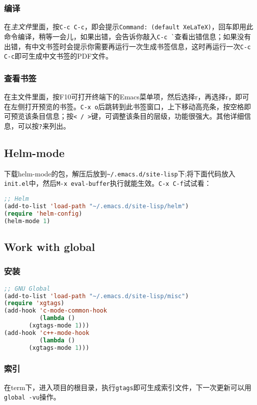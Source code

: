 \subsubsection{编译}
\label{sec:auctex-compile}
在\emph{主文件}里面，按\verb|C-c C-c|，即会提示\verb|Command: (default XeLaTeX)|，回车即用此命令编译，稍等一会儿，如果出错，会告诉你敲入\verb|C-c `|查看出错信息；如果没有出错，有中文书签时会提示你需要再运行一次生成书签信息，这时再运行一次\verb|C-c C-c|即可生成中文书签的PDF文件。
\subsubsection{查看书签}
\label{sec:auctex-view-toc}
在主文件里面，按F10可打开终端下的Emacs菜单项，然后选择r，再选择r，即可在左侧打开预览的书签。\verb|C-x o|后跳转到此书签窗口，上下移动高亮条，按空格即可预览该条目信息；按\verb|< / >|键，可调整该条目的层级，功能很强大。其他详细信息，可以按\verb|?|来列出。

\subsection{Helm-mode}
\label{sec:helm-mode}
下载helm-mode的包，解压后放到\verb|~/.emacs.d/site-lisp|下;将下面代码放入\verb|init.el|中，然后\verb|M-x eval-buffer|执行就能生效。\verb|C-x C-f|试试看：
\begin{lstlisting}[language={lisp},label=helm-mode,caption=安装helm-mode]
;; Helm
(add-to-list 'load-path "~/.emacs.d/site-lisp/helm")
(require 'helm-config)
(helm-mode 1)
\end{lstlisting}

\subsection{Work with global}
\label{part:work-with-global}

\subsubsection{安装}
\begin{lstlisting}[language={lisp},label=xgtags-mode,caption=安装xgtags-mode]
;; GNU Global
(add-to-list 'load-path "~/.emacs.d/site-lisp/misc")
(require 'xgtags)
(add-hook 'c-mode-common-hook
          (lambda ()
       (xgtags-mode 1)))
(add-hook 'c++-mode-hook
          (lambda ()
       (xgtags-mode 1)))
\end{lstlisting}

\subsubsection{索引}
在term下，进入项目的根目录，执行\verb|gtags|即可生成索引文件，下一次更新可以用\verb|global -vu|操作。
